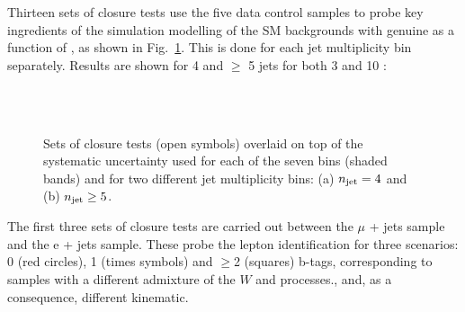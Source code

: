 Thirteen sets of closure tests use the five data control samples to
probe key ingredients of the simulation modelling of the SM
backgrounds with genuine \met as a function of \scalht, as shown in
Fig.~\ref{fig:closure}. This is done for each jet multiplicity bin
separately. Results are shown for 4 and $\geq$ 5 jets for both 3 \ifb and 10 \ifb: 
\begin{figure}[h!]
  \begin{center}
     ~~
     \\
     ~~
     \\
    \caption{Sets of closure tests (open symbols) overlaid on top of
      the systematic uncertainty used for each of the seven \scalht
      bins (shaded bands) and for two different jet
      multiplicity bins: (a) $n_{\text{jet}} = 4$ and (b) $n_{\text{jet}} \geq5$.}
    \label{fig:closure}
  \end{center} 
\end{figure}

The first three sets of closure tests are carried out between the $\mu$ 
+ jets sample and the e + jets sample. These probe the lepton 
identification for three scenarios: 0 (red circles), 
1 (times symbols) and $\geq$2 (squares) b-tags, corresponding to samples with a different admixture of the $W$ and \ttbar processes., 
and, as a consequence, different kinematic. 

